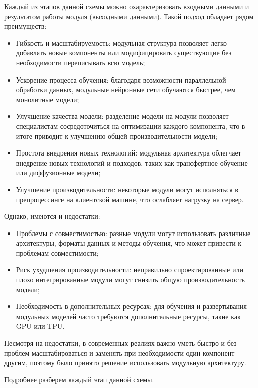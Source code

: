 Каждый из этапов данной схемы можно охарактеризовать входными данными и результатом работы модуля (выходными данными).
Такой подход обладает рядом преимуществ:
\begin{itemize}
    \item Гибкость и масштабируемость: модульная структура позволяет легко добавлять новые компоненты или модифицировать существующие без необходимости переписывать всю модель;
    \item Ускорение процесса обучения: благодаря возможности параллельной обработки данных, модульные нейронные сети обучаются быстрее, чем монолитные модели;
    \item Улучшение качества модели: разделение модели на модули позволяет специалистам сосредоточиться на оптимизации каждого компонента, что в итоге приводит к улучшению общей производительности модели;
    \item Простота внедрения новых технологий: модульная архитектура облегчает внедрение новых технологий и подходов, таких как трансфертное обучение или диффузионные модели;
    \item Улучшение производительности: некоторые модули могут исполняться в препроцессинге на клиентской машине, что ослабляет нагрузку на сервер.
\end{itemize}
Однако, имеются и недостатки:
\begin{itemize}
    \item Проблемы с совместимостью: разные модули могут использовать различные архитектуры, форматы данных и методы обучения, что может привести к проблемам совместимости;
    \item Риск ухудшения производительности: неправильно спроектированные или плохо интегрированные модули могут снизить общую производительность модели;
    \item Необходимость в дополнительных ресурсах: для обучения и развертывания модульных моделей часто требуются дополнительные ресурсы, такие как GPU или TPU.
\end{itemize}

Несмотря на недостатки, в современных реалиях важно уметь быстро и без проблем масштабироваться и заменять при необходимости один компонент другим, поэтому было принято решение использовать модульную архитектуру.

Подробнее разберем каждый этап данной схемы.